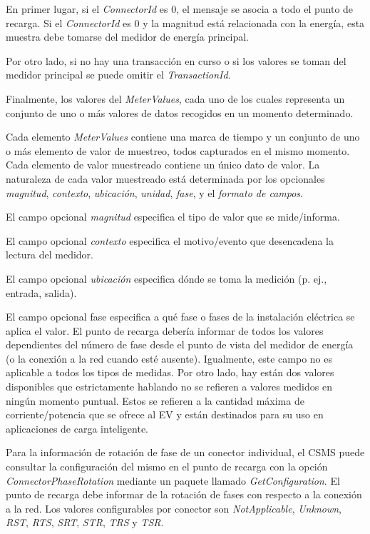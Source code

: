 \documentclass[12pt,a4paper,onecolumn,oneside]{report}
\begin{document}
En primer lugar, si el \textit{ConnectorId} es 0, el mensaje se asocia a todo el punto de recarga. Si el \textit{ConnectorId} es 0 y la magnitud está relacionada con la energía, esta muestra debe tomarse del medidor de energía principal.

Por otro lado, si no hay una transacción en curso o si los valores se toman del medidor principal se puede omitir el \textit{TransactionId}. 

Finalmente, los valores del \textit{MeterValues}, cada uno de los cuales representa un conjunto de uno o más valores de datos recogidos en un momento determinado.

Cada elemento \textit{MeterValues} contiene una marca de tiempo y un conjunto de uno o más elemento de valor de muestreo, todos capturados en el mismo momento. Cada elemento de valor muestreado contiene un único dato de valor. La naturaleza de cada valor muestreado está determinada por los opcionales \textit{magnitud}, \textit{contexto}, \textit{ubicación}, \textit{unidad}, \textit{fase}, y el \textit{formato de campos}.

El campo opcional \textit{magnitud} especifica el tipo de valor que se mide/informa.

El campo opcional \textit{contexto} especifica el motivo/evento que desencadena la lectura del medidor.

El campo opcional \textit{ubicación} especifica dónde se toma la medición (p. ej., entrada, salida).

El campo opcional fase especifica a qué fase o fases de la instalación eléctrica se aplica el valor. El punto de recarga debería informar de todos los valores dependientes del número de fase desde el punto de vista del medidor de energía (o la conexión a la red cuando esté ausente). Igualmente, este campo no es aplicable a todos los tipos de medidas. Por otro lado, hay están dos valores disponibles que estrictamente hablando no se refieren a valores medidos en ningún momento puntual. Estos se refieren a la cantidad máxima de corriente/potencia que se ofrece al EV y están destinados para su uso en aplicaciones de carga inteligente.

Para la información de rotación de fase de un conector individual, el CSMS puede consultar la configuración del mismo en el punto de recarga con la opción \textit{ConnectorPhaseRotation} mediante un paquete llamado \textit{GetConfiguration}. El punto de recarga debe informar de la rotación de fases con respecto a la conexión a la red. Los valores configurables por conector son \textit{NotApplicable}, \textit{Unknown}, \textit{RST}, \textit{RTS}, \textit{SRT}, \textit{STR}, \textit{TRS} y \textit{TSR}. 
\end{document}
